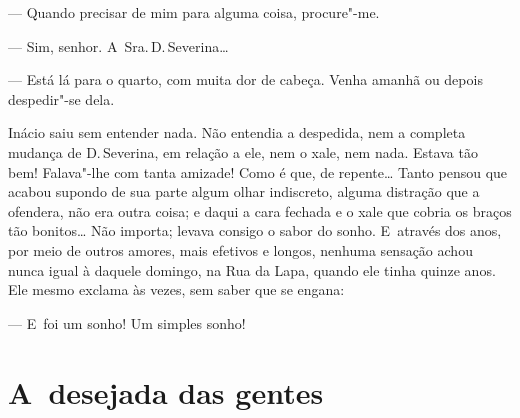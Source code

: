 \begin{linenumbers}
--- Quando precisar de mim para alguma coisa, procure"-me.

--- Sim, senhor. A~Sra.\,D.\,Severina\ldots{}

--- Está lá para o quarto, com muita dor de cabeça. Venha amanhã ou
depois despedir"-se dela.

Inácio saiu sem entender nada. Não entendia a despedida, nem a completa
mudança de D.\,Severina, em relação a ele, nem o xale, nem nada. Estava
tão bem! Falava"-lhe com tanta amizade! Como é que, de repente\ldots{} Tanto
pensou que acabou supondo de sua parte algum olhar indiscreto, alguma
distração que a ofendera, não era outra coisa; e daqui a cara fechada e
o xale que cobria os braços tão bonitos\ldots{} Não importa; levava consigo o
sabor do sonho. E~através dos anos, por meio de outros amores, mais
efetivos e longos, nenhuma sensação achou nunca igual à daquele domingo,
na Rua da Lapa, quando ele tinha quinze anos. Ele mesmo exclama às
vezes, sem saber que se engana:\nopagebreak

--- E~foi um sonho! Um simples sonho!

\end{linenumbers}

\chapter{A~desejada das gentes}

